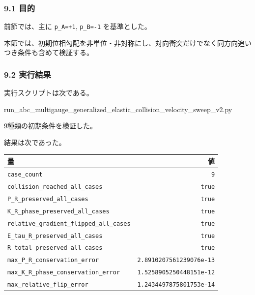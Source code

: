 \documentclass[
  a4paper,
]{article}
\newenvironment{Shaded}{}{}
\newcommand{\NormalTok}[1]{#1}
\newcounter{none} %
\begin{document}
\subsubsection{9.1 目的}\label{ux76eeux7684}

前節では、主に \texttt{p\_A=+1}, \texttt{p\_B=-1} を基準とした。

本節では、初期位相勾配を非単位・非対称にし、対向衝突だけでなく同方向追いつき条件も含めて検証する。

\subsubsection{9.2 実行結果}\label{ux5b9fux884cux7d50ux679c-1}

実行スクリプトは次である。

\begin{Shaded}
\begin{Highlighting}[]
\NormalTok{run\_abc\_multigauge\_generalized\_elastic\_collision\_velocity\_sweep\_v2.py}
\end{Highlighting}
\end{Shaded}

9種類の初期条件を検証した。

結果は次であった。

{\def\LTcaptype{none} %
\begin{longtable}[]{@{}lr@{}}
\toprule\noalign{}
量 & 値 \\
\midrule\noalign{}
\endhead
\bottomrule\noalign{}
\endlastfoot
\texttt{case\_count} & \texttt{9} \\
\texttt{collision\_reached\_all\_cases} & \texttt{true} \\
\texttt{P\_R\_preserved\_all\_cases} & \texttt{true} \\
\texttt{K\_R\_phase\_preserved\_all\_cases} & \texttt{true} \\
\texttt{relative\_gradient\_flipped\_all\_cases} & \texttt{true} \\
\texttt{E\_tau\_R\_preserved\_all\_cases} & \texttt{true} \\
\texttt{R\_total\_preserved\_all\_cases} & \texttt{true} \\
\texttt{max\_P\_R\_conservation\_error} &
\texttt{2.8910207561239076e-13} \\
\texttt{max\_K\_R\_phase\_conservation\_error} &
\texttt{1.5258905250448151e-12} \\
\texttt{max\_relative\_flip\_error} & \texttt{1.2434497875801753e-14} \\
\end{longtable}
}
\end{document}
